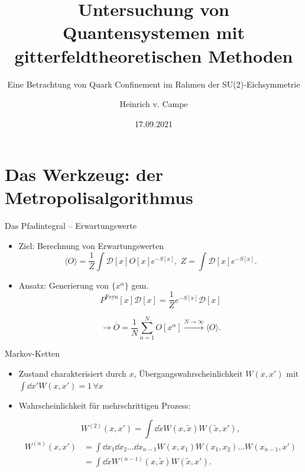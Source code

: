 \documentclass[ngerman]{beamer}
\title[SU(2): statisches Potential]{Untersuchung von Quantensystemen mit gitterfeldtheoretischen Methoden}
\subtitle{Eine Betrachtung von Quark Confinement im Rahmen der SU(2)-Eichsymmetrie}
\author{Heinrich v. Campe}
\date{17.09.2021}
\begin{document}
\begin{frame}
  \titlepage
\end{frame}



\section{Das Werkzeug: der Metropolisalgorithmus}

\begin{frame}{Das Pfadintegral -- Erwartungswerte}
\begin{itemize}
	\item Ziel: Berechnung von Erwartungswerten
	\[
	\langle O \rangle = \frac{1}{Z} \int \mathscr{D}[x] O[x] e^{-S[x]}, \; Z = \int \mathscr{D}[x] e^{-S[x]}.
	\]

	\item Ansatz: Generierung von $\{x^\alpha\}$ gem.
	\[
	P^\text{Feyn}[x] \mathscr{D}[x] =  \frac{1}{Z} e^{-S[x]} \mathscr{D}[x]
	\]
	
	\[
	\rightarrow \overline{O} = \frac{1}{N} \sum_{\alpha=1}^N O[x^\alpha]
	\xrightarrow{N \rightarrow \infty} \langle O \rangle.
	\]
\end{itemize}
\end{frame}

\begin{frame}{Markov-Ketten}
\begin{itemize}
\item Zustand charakterisiert durch $x$, Übergangswahrscheinlichkeit $W(x,x')$ mit $\int \dd{x'} W(x,x') = 1\, \forall x$
\item Wahrscheinlichkeit für mehrschrittigen Prozess:
\begin{overprint}
	\[
	W^{(2)}(x,x') = \int \dd{\tilde{x}} W(x,\tilde{x}) W(\tilde{x}, x'),
	\]
	\onslide<2>
	\begin{align*}
	W^{(n)}(x,x') &= \int \dd{x_1} \dd{x_2} \dots \dd{x_{n-1}} W(x,x_1) W(x_1, x_2) \dots W(x_{n-1},x') \\
	&= \int \dd{\tilde{x}} W^{(n-1)}(x, \tilde{x}) W(\tilde{x}, x').
	\end{align*}
\end{overprint}
\end{itemize}
\end{frame}
\end{document}

